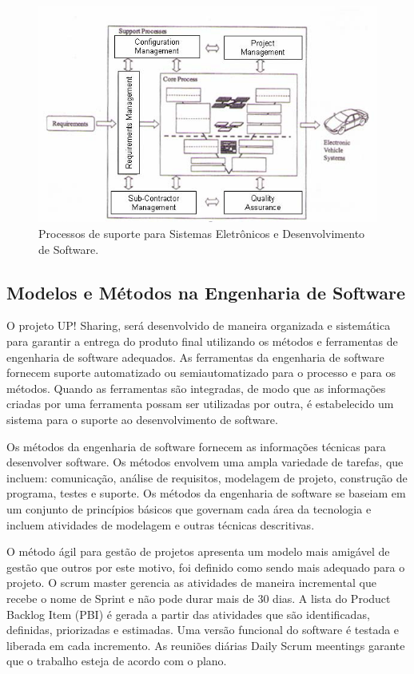 \documentclass[12pt]{article}
\begin{document}
\begin{figure}[ht]
\centering
\includegraphics[scale=.7] {swebok_engenharia.png}
\caption{Processos de suporte para Sistemas Eletrônicos e Desenvolvimento de Software.}
\label{fig:exampleFig4}
\end{figure}

\subsection{Modelos e Métodos na Engenharia de Software}

O projeto UP! Sharing, será desenvolvido de maneira organizada e sistemática para garantir a entrega do produto final utilizando os métodos e ferramentas de engenharia de software adequados. 
As ferramentas da engenharia de software fornecem suporte automatizado ou semiautomatizado para o processo e para os métodos. Quando as ferramentas são integradas, de modo que as informações criadas por uma ferramenta possam ser utilizadas por outra, é estabelecido um sistema para o suporte ao desenvolvimento de software.
\cite{pressman2016engenharia}

Os métodos da engenharia de software fornecem as informações técnicas para desenvolver software. Os métodos envolvem uma ampla variedade de tarefas, que incluem: comunicação, análise de requisitos, modelagem de projeto, construção de programa, testes e suporte. Os métodos da engenharia de software se baseiam em um conjunto de princípios básicos que governam cada área da tecnologia e incluem atividades de modelagem e outras técnicas descritivas.

O método ágil para gestão de projetos apresenta um modelo mais amigável de gestão que outros por este motivo, foi definido como sendo mais adequado para o projeto. O scrum master gerencia as atividades de maneira incremental que recebe o nome de Sprint e não pode durar mais de 30 dias. A lista do Product Backlog Item (PBI) é gerada a partir das atividades que são identificadas, definidas, priorizadas e estimadas. Uma versão funcional do software é testada e liberada em cada incremento. As reuniões diárias Daily Scrum meentings garante que o trabalho esteja de acordo com o plano. \cite{Bourque2014}
\end{document}
